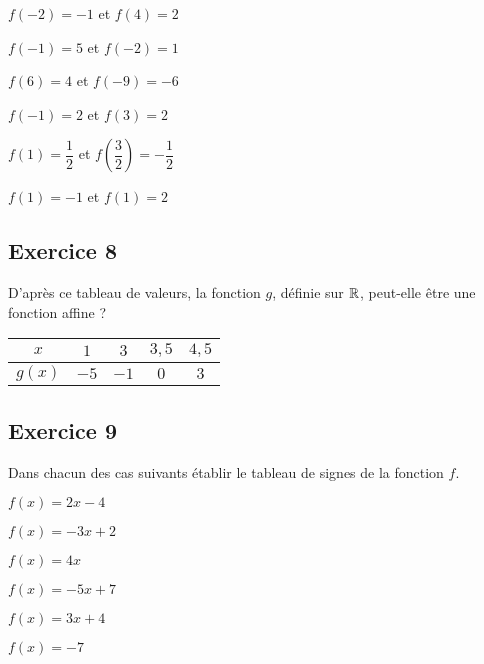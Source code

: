 \documentclass[12pt,a4paper]{article}
\begin{document}
\begin{enumerate}
\begin{minipage}[c]{0.4\linewidth}
\item $f(-2)=-1$ et $f(4)=2$
\item $f(-1)=5$ et $f(-2)=1$
\end{minipage}
\begin{minipage}[c]{0.4\linewidth}
\item $f(6)=4$ et $f(-9)=-6$
\item $f(-1)=2$ et $f(3)=2$
\end{minipage}
\begin{minipage}[c]{0.4\linewidth}
\item $f(1)=\dfrac{1}{2}$ et $f\left(\dfrac{3}{2}\right)=-\dfrac{1}{2}$
\item $f(1)=-1$ et $f(1)=2$
\end{minipage}
\end{enumerate}

\subsection*{Exercice 8}

D'après ce tableau de valeurs, la fonction $g$, définie sur $\mathbb{R}$, peut-elle être une fonction affine ?

\begin{center}
 { \setlength{\tabcolsep}{9mm}
\begin{tabular}{|c|c|c|c|c|} \hline
$x$ & $1$&$3$& $3,5$&$4,5$ \\ \hline
$g(x)$ &$-5$ & $-1$&$0$&$3$  \\ \hline
\end{tabular} }
   
\end{center}

\subsection*{Exercice 9}
Dans chacun des cas suivants établir le tableau de signes de la fonction $f$.

\begin{enumerate}
\begin{minipage}[c]{0.4\linewidth}
\item $f(x)=2x-4$
\item $f(x)=-3x+2$
\end{minipage}
\begin{minipage}[c]{0.4\linewidth}
\item $f(x)=4x$
\item $f(x)=-5x+7$
\end{minipage}
\begin{minipage}[c]{0.4\linewidth}
\item $f(x)=3x+4$ 
\item $f(x)=-7$
\end{minipage}
\end{enumerate}
\end{document}
